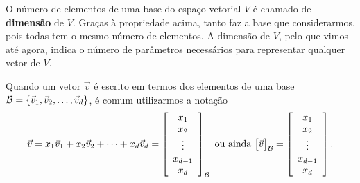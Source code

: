 \documentclass[../livro.tex]{subfiles}  %
\begin{document}
O número de elementos de uma base do espaço vetorial $V$ é chamado de \textbf{dimensão} de $V$. Graças à propriedade acima, tanto faz a base que considerarmos, pois todas tem o mesmo número de elementos. A dimensão de $V$, pelo que vimos até agora, indica o número de parâmetros necessários para representar qualquer vetor de $V$.

Quando um vetor $\vec{v}$ é escrito em termos dos elementos de uma base $\mathcal{B} = \{\vec{v}_1, \vec{v}_2, \dots, \vec{v}_d\}$, é comum utilizarmos a notação
\[
\vec{v} = x_1 \vec{v}_1 + x_2 \vec{v}_2 + \cdots  + x_d \vec{v}_d =
\left[
\begin{array}{c}
x_1 \\
x_2 \\
\vdots \\
x_{d-1} \\
x_d \\
\end{array}
\right]_{\mathcal{B}} \text{ ou ainda } \big[ \vec{v} \big]_{\mathcal{B}} =
\left[
\begin{array}{c}
x_1 \\
x_2 \\
\vdots \\
x_{d-1} \\
x_d \\
\end{array}
\right].
\]
\end{document}
